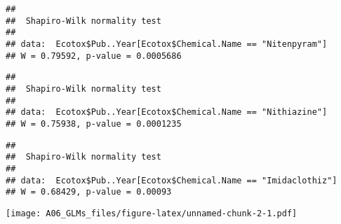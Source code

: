 \documentclass[]{article}
\newenvironment{Shaded}{\begin{snugshade}}{\end{snugshade}}
\newcommand{\KeywordTok}[1]{\textcolor[rgb]{0.13,0.29,0.53}{\textbf{#1}}}
\newcommand{\StringTok}[1]{\textcolor[rgb]{0.31,0.60,0.02}{#1}}
\newcommand{\CommentTok}[1]{\textcolor[rgb]{0.56,0.35,0.01}{\textit{#1}}}
\newcommand{\OperatorTok}[1]{\textcolor[rgb]{0.81,0.36,0.00}{\textbf{#1}}}
\newcommand{\NormalTok}[1]{#1}
\begin{document}
\begin{verbatim}
## 
##  Shapiro-Wilk normality test
## 
## data:  Ecotox$Pub..Year[Ecotox$Chemical.Name == "Nitenpyram"]
## W = 0.79592, p-value = 0.0005686
\end{verbatim}

\begin{Shaded}
\end{Shaded}

\begin{verbatim}
## 
##  Shapiro-Wilk normality test
## 
## data:  Ecotox$Pub..Year[Ecotox$Chemical.Name == "Nithiazine"]
## W = 0.75938, p-value = 0.0001235
\end{verbatim}

\begin{Shaded}
\end{Shaded}

\begin{verbatim}
## 
##  Shapiro-Wilk normality test
## 
## data:  Ecotox$Pub..Year[Ecotox$Chemical.Name == "Imidaclothiz"]
## W = 0.68429, p-value = 0.00093
\end{verbatim}

\begin{Shaded}
\end{Shaded}

\texttt{[image: A06\_GLMs\_files/figure-latex/unnamed-chunk-2-1.pdf]}
\end{document}
